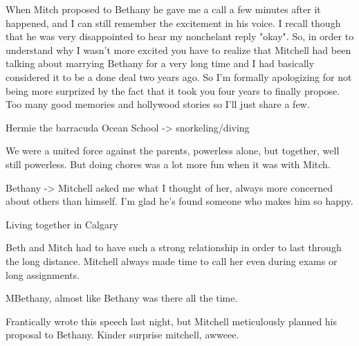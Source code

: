 \documentclass{letter}
\begin{document}
 When Mitch proposed to Bethany he gave me a call a few minutes after it happened, and I can still remember the excitement in his voice. I recall though that he was very disappointed to hear my nonchelant reply "okay". So, in order to understand why I wasn't more excited you have to realize that Mitchell had been talking about marrying Bethany for a very long time and I had basically considered it to be a done deal two years ago. So I'm formally apologizing for not being more surprized by the fact that it took you four years to finally propose.
Too many good memories and hollywood stories so I'll just share a few.

Hermie the barracuda
Ocean School -> snorkeling/diving

We were a united force against the parents, powerless alone, but together, well still powerless. But doing chores was a lot more fun when it was with Mitch.

Bethany -> Mitchell asked me what I thought of her, always more concerned about others than himself. I'm glad he's found someone who makes him so happy.

Living together in Calgary

Beth and Mitch had to have such a strong relationship in order to last through the long distance. Mitchell always made time to call her even during exams or long assignments.

MBethany, almost like Bethany was there all the time.

Frantically wrote this speech last night, but Mitchell meticulously planned his proposal to Bethany. Kinder surprise mitchell, awweee.
\end{document}
